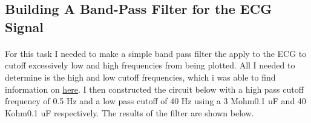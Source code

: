 \documentclass[12pt]{article}
\begin{document}
		\subsection{Building A Band-Pass Filter for the ECG Signal}
			\paragraph{}
				For this task I needed to make a simple band pass filter the apply to the ECG to cutoff excessively low 
				and high frequencies from being plotted.  All I needed to determine is the high and low cutoff frequencies, 
				which i was able to find information on \href{https://link.springer.com/article/10.1007\%2Fs10527-016-9600-8}{here}. 
				 I then constructed the circuit below with a high pass cutoff frequency of 0.5 Hz and a low pass cutoff of 40 
				 Hz using a 3 Mohm\/0.1 uF and 40 Kohm\/0.1 uF respectively.  The results of the filter are shown below.
\end{document}
